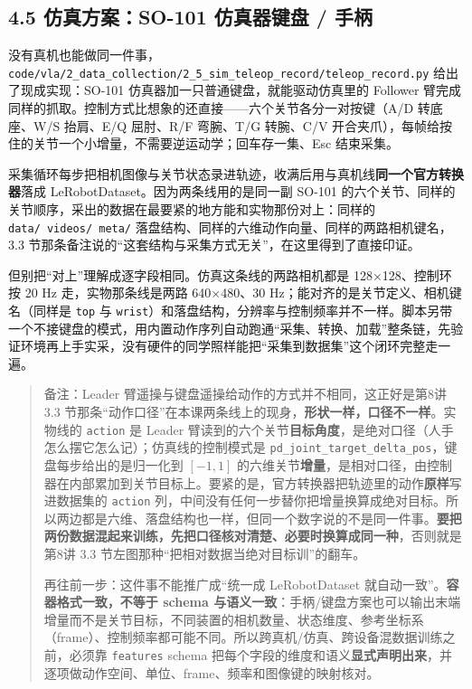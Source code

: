 \documentclass[
  chinese,
]{ctexart}
\begin{document}
\subsection{4.5 仿真方案：SO-101 仿真器键盘 /
手柄}\label{ux4effux771fux65b9ux6848so-101-ux4effux771fux5668ux952eux76d8-ux624bux67c4}

没有真机也能做同一件事，\texttt{code/vla/2\_data\_collection/2\_5\_sim\_teleop\_record/teleop\_record.py}
给出了现成实现：SO-101 仿真器加一只普通键盘，就能驱动仿真里的 Follower
臂完成同样的抓取。控制方式比想象的还直接------六个关节各分一对按键（A/D
转底座、W/S 抬肩、E/Q 屈肘、R/F 弯腕、T/G 转腕、C/V
开合夹爪），每帧给按住的关节一个小增量，不需要逆运动学；回车存一集、Esc
结束采集。

采集循环每步把相机图像与关节状态录进轨迹，收满后用与真机线\textbf{同一个官方转换器}落成
LeRobotDataset。因为两条线用的是同一副 SO-101
的六个关节、同样的关节顺序，采出的数据在最要紧的地方能和实物那份对上：同样的
\texttt{data/\ videos/\ meta/}
落盘结构、同样的六维动作向量、同样的两路相机键名，3.3
节那条备注说的``这套结构与采集方式无关''，在这里得到了直接印证。

但别把``对上''理解成逐字段相同。仿真这条线的两路相机都是
128×128、控制环按 20 Hz 走，实物那条线是两路 640×480、30
Hz；能对齐的是关节定义、相机键名（同样是 \texttt{top} 与
\texttt{wrist}）和落盘结构，分辨率与控制频率并不一样。脚本另带一个不接键盘的模式，用内置动作序列自动跑通``采集、转换、加载''整条链，先验证环境再上手实采，没有硬件的同学照样能把``采集到数据集''这个闭环完整走一遍。

\begin{quote}
备注：Leader 臂遥操与键盘遥操给动作的方式并不相同，这正好是第8讲 3.3
节那条``动作口径''在本课两条线上的现身，\textbf{形状一样，口径不一样}。实物线的
\texttt{action} 是 Leader
臂读到的六个关节\textbf{目标角度}，是绝对口径（人手怎么摆它怎么记）；仿真线的控制模式是
\texttt{pd\_joint\_target\_delta\_pos}，键盘每步给出的是归一化到
\([-1, 1]\)
的六维关节\textbf{增量}，是相对口径，由控制器在内部累加到关节目标上。要紧的是，官方转换器把轨迹里的动作\textbf{原样}写进数据集的
\texttt{action}
列，中间没有任何一步替你把增量换算成绝对目标。所以两边都是六维、落盘结构也一样，但同一个数字说的不是同一件事。\textbf{要把两份数据混起来训练，先把口径核对清楚、必要时换算成同一种}，否则就是第8讲
3.3 节左图那种``把相对数据当绝对目标训''的翻车。

再往前一步：这件事不能推广成``统一成 LeRobotDataset
就自动一致''。\textbf{容器格式一致，不等于 schema
与语义一致}：手柄/键盘方案也可以输出末端增量而不是关节目标，不同装置的相机数量、状态维度、参考坐标系（frame）、控制频率都可能不同。所以跨真机/仿真、跨设备混数据训练之前，必须靠
\texttt{features} schema
把每个字段的维度和语义\textbf{显式声明出来}，并逐项做动作空间、单位、frame、频率和图像键的映射核对。
\end{quote}
\end{document}
